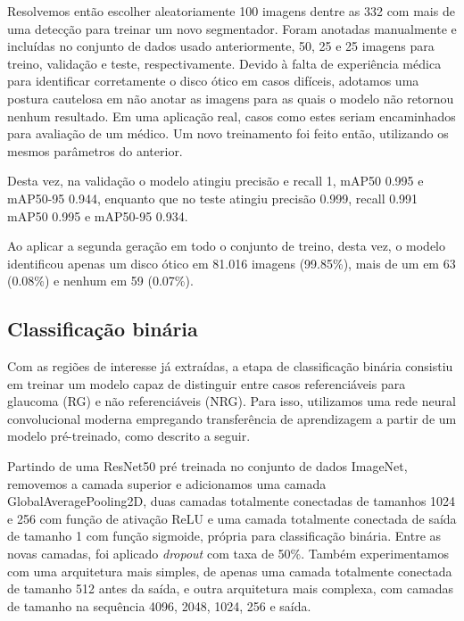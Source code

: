 \documentclass[12pt]{article}
\begin{document}
Resolvemos então escolher aleatoriamente 100 imagens dentre as 332 com mais de uma detecção para treinar um novo segmentador. Foram anotadas manualmente e incluídas no conjunto de dados usado anteriormente, 50, 25 e 25 imagens para treino, validação e teste, respectivamente. Devido à falta de experiência médica para identificar corretamente o disco ótico  em casos difíceis, adotamos uma postura cautelosa em não anotar as imagens para as quais o modelo não retornou nenhum resultado. Em uma aplicação real, casos como estes seriam encaminhados para avaliação de um médico. Um novo treinamento foi feito então, utilizando os mesmos parâmetros do anterior.

Desta vez, na validação o modelo atingiu precisão e recall 1, mAP50 0.995 e mAP50-95 0.944, enquanto que no teste atingiu precisão 0.999, recall 0.991 mAP50 0.995 e mAP50-95 0.934.

Ao aplicar a segunda geração em todo o conjunto de treino, desta vez, o modelo identificou apenas um disco ótico em 81.016 imagens (99.85\%), mais de um em 63 (0.08\%) e nenhum em 59 (0.07\%).






\subsection{Classificação binária}
\label{sec:binary_classification}

Com as regiões de interesse já extraídas, a etapa de classificação binária consistiu em treinar um modelo capaz de distinguir entre casos referenciáveis para glaucoma (RG) e não referenciáveis (NRG). Para isso, utilizamos uma rede neural convolucional moderna empregando transferência de aprendizagem a partir de um modelo pré-treinado, como descrito a seguir.

Partindo de uma ResNet50 pré treinada no conjunto de dados ImageNet, removemos a camada superior e adicionamos uma camada GlobalAveragePooling2D, duas camadas totalmente conectadas de tamanhos 1024 e 256 com função de ativação ReLU e uma camada totalmente conectada de saída de tamanho 1 com função sigmoide, própria para classificação binária. Entre as novas camadas, foi aplicado \emph{dropout} com taxa de 50\%. Também experimentamos com uma arquitetura mais simples, de apenas uma camada totalmente conectada de tamanho 512 antes da saída, e outra arquitetura mais complexa, com camadas de tamanho na sequência 4096, 2048, 1024, 256 e saída.
\end{document}
